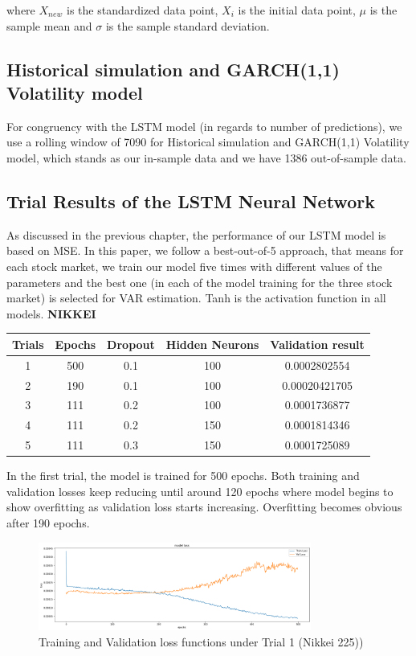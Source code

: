 \documentclass[a4paper,11pt,oneside]{book}
\begin{document}
where $X_{new}$ is the standardized data point, $X_{i}$ is the initial data point, $\mu$ is the sample mean and $\sigma$ is the sample standard deviation.


\subsection{Historical simulation and GARCH(1,1) Volatility model}
For congruency with the LSTM model (in regards to number of predictions), we use a rolling window of 7090 for Historical simulation and GARCH(1,1) Volatility model, which stands as our in-sample data and we have 1386 out-of-sample data.

\subsection{Trial Results of the LSTM Neural Network}

As discussed in the previous chapter, the performance of our LSTM model is based on MSE. In this paper, we follow a best-out-of-5 approach, that means for each stock market, we train our model five times with different values of the parameters and the best one (in each of the model training for the three stock market) is selected for VAR estimation. Tanh is the activation function in all models.\newline\newline
\textbf{NIKKEI}


\begin{center}
	\begin{tabular}{||c c c c c||} 
		\hline
		Trials & Epochs & Dropout & Hidden Neurons & Validation result\\ [0.5ex] 
		\hline\hline
		1 & 500 & 0.1 & 100 & 0.0002802554 \\ 
		\hline
		2 & 190 & 0.1 & 100 & 0.00020421705 \\
		\hline
		3 & 111 & 0.2 & 100 & 0.0001736877 \\
		\hline
		4 & 111 & 0.2 & 150 & 0.0001814346 \\
		\hline
		5 & 111 & 0.3 & 150 & 0.0001725089\\ [1ex] 
		\hline
	\end{tabular}
\end{center}

In the first trial, the model is trained for 500 epochs. Both training and validation losses keep reducing until around 120 epochs where model begins to show overfitting as validation loss starts increasing. Overfitting becomes obvious after 190 epochs.\newline
\begin{figure}[!h]
	\centering
	\includegraphics[width=0.8\textwidth]{figures/Nik1}
	\caption{Training and Validation loss functions under Trial 1 (Nikkei 225))}
	\label{Nik1}
\end{figure}
\end{document}

